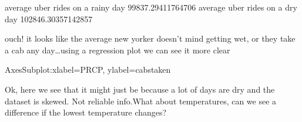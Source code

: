 \documentclass[letterpaper,10pt,english]{jupyterBook}
\begin{document}
\begin{sphinxVerbatim}[commandchars=\\\{\}]
\PYG{p}{[}\PYG{p}{]}
\PYG{p}{[}\PYG{p}{]}
\end{sphinxVerbatim}

\begin{sphinxVerbatim}[commandchars=\\\{\}]
average uber rides on a rainy day
99837.29411764706
average uber rides on a dry day
102846.30357142857
\end{sphinxVerbatim}

\sphinxAtStartPar
ouch! it looks like the average new yorker doesn’t mind getting wet, or they take a cab any day…using a regression plot we can see it more clear

\begin{sphinxVerbatim}[commandchars=\\\{\}]
  
\end{sphinxVerbatim}

\begin{sphinxVerbatim}[commandchars=\\\{\}]
\PYGZlt{}AxesSubplot:xlabel=\PYGZsq{}PRCP\PYGZsq{}, ylabel=\PYGZsq{}cabs\PYGZus{}taken\PYGZsq{}\PYGZgt{}
\end{sphinxVerbatim}

\noindent{}

\sphinxAtStartPar
Ok, here we see that it might just be because a lot of days are dry and the dataset is skewed. Not reliable info.What about temperatures, can we see a difference if the lowest temperature changes?
\end{document}
